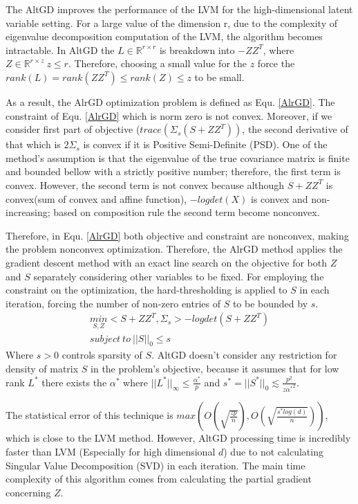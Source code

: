 \documentclass[10pt,conference]{IEEEtran}
\begin{document}
The AltGD \cite{xu2017speeding} improves the performance of the LVM for the high-dimensional latent variable setting. For a large value of the dimension r, due to the complexity of eigenvalue decomposition computation of the LVM, the algorithm \cite{Chandra_1} becomes intractable. In AltGD the $L \in \mathbb{R}^{r \times r}$ is breakdown into $-Z Z^T$, where $Z \in \mathbb{R}^{r \times z} \ z \leq r$. Therefore, choosing a small value for the $z$ force the $rank(L) = rank(Z Z^T) \leq rank(Z) \leq z$ to be small. 

As a result, the AlrGD \cite{xu2017speeding} optimization problem is defined as Equ. \ref{AlrGD}. The constraint of Equ. \ref{AlrGD} which is norm zero is not convex. Moreover, if we consider first part of objective ($trace(\Sigma_s (S + Z Z^T))$, the second derivative of that which is $2 \Sigma_s$ is convex if it is Positive Semi-Definite (PSD). One of the method's assumption is that the eigenvalue of the true covariance matrix is finite and bounded bellow with a strictly positive number; therefore, the first term is convex. However, the second term is not convex because although $S+Z Z^T$ is convex(sum of convex and affine function), $-logdet(X)$ is convex and non-increasing; based on composition rule the second term become nonconvex. 

Therefore, in Equ. \ref{AlrGD} both objective and constraint are nonconvex, making the problem nonconvex optimization. Therefore, the AlrGD method applies the gradient descent method with an exact line search on the objective for both $Z$ and $S$ separately considering other variables to be fixed. For employing the constraint on the optimization, the hard-thresholding is applied to $S$ in each iteration, forcing the number of non-zero entries of $S$ to be bounded by $s$.
\begin{align}
    \label{AlrGD}
    \underset{S,Z}{min} <S + Z Z^T, \Sigma_s> - logdet(S + Z Z^T) \\
    subject \ to \ ||S||_0 \leq s \nonumber 
\end{align}
Where $s > 0$ controls sparsity of $S$.
AltGD doesn't consider any restriction for density of matrix $S$ in the problem's objective, because it assumes that for low rank $L^*$ there exists the $\alpha^*$ where $|| L^* ||_{\infty} \leq \frac{\alpha^*}{p}$ and $s^* = ||S^*||_0 \lesssim \frac{p^2}{z {\alpha^*}^2}$.

The statistical error of this technique is $max ( O(\sqrt{\frac{z p}{n}}) , O(\sqrt{\frac{s^* log(d)}{n}}) )$, which is close to the LVM method. However, AltGD processing time is incredibly faster than LVM (Especially for high dimensional $d$) due to not calculating Singular Value Decomposition (SVD) in each iteration. The main time complexity of this algorithm comes from calculating the partial gradient concerning $Z$.
\end{document}
